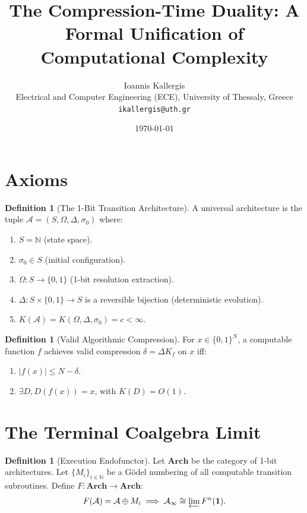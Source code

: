 \documentclass[12pt,a4paper]{article}
\title{The Compression-Time Duality: A Formal Unification of Computational Complexity}
\author{Ioannis Kallergis \\ \small Electrical and Computer Engineering (ECE), University of Thessaly, Greece \\ \small \texttt{ikallergis@uth.gr}}
\date{\today}
\theoremstyle{plain}
\theoremstyle{definition}
\newtheorem{definition}[theorem]{Definition}
\begin{document}
\maketitle

\section{Axioms}

\begin{definition}[The 1-Bit Transition Architecture]
A universal architecture is the tuple $\mathcal{A} = (S, \Omega, \Delta, \sigma_0)$ where:
\begin{enumerate}
    \item $S = \mathbb{N}$ (state space).
    \item $\sigma_0 \in S$ (initial configuration).
    \item $\Omega : S \to \{0,1\}$ (1-bit resolution extraction).
    \item $\Delta : S \times \{0,1\} \to S$ is a reversible bijection (deterministic evolution).
    \item $K(\mathcal{A}) = K(\Omega, \Delta, \sigma_0) = c < \infty$.
\end{enumerate}
\end{definition}

\begin{definition}[Valid Algorithmic Compression]
For $x \in \{0,1\}^N$, a computable function $f$ achieves valid compression $\delta = \Delta K_f$ on $x$ iff:
\begin{enumerate}
    \item $|f(x)| \le N - \delta$.
    \item $\exists D, D(f(x)) = x$, with $K(D) = O(1)$.
\end{enumerate}
\end{definition}

\section{The Terminal Coalgebra Limit}

\begin{definition}[Execution Endofunctor]
Let $\mathbf{Arch}$ be the category of 1-bit architectures. Let $\{M_i\}_{i \in \mathbb{N}}$ be a G\"odel numbering of all computable transition subroutines. Define $F : \mathbf{Arch} \to \mathbf{Arch}$:
\begin{equation}
F(\mathcal{A}) = \mathcal{A} \oplus M_i \implies \mathcal{A}_\infty \cong \varprojlim F^n(\mathbf{1}).
\end{equation}
\end{definition}
\end{document}
